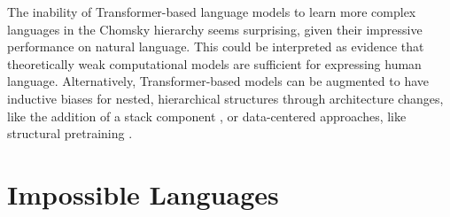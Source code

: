 \documentclass[11pt]{article}
\begin{document}
The inability of Transformer-based language models to learn more complex languages in the Chomsky hierarchy seems surprising, given their impressive performance on natural language. This could be interpreted as evidence that theoretically weak computational models are sufficient for expressing human language. Alternatively, Transformer-based models can be augmented to have inductive biases for nested, hierarchical structures through architecture changes, like the addition of a stack component  \cite{hao-etal-2018-context, murty2023pushdown}, or data-centered approaches, like structural pretraining \cite{papadimitriou2023injecting}.

\section{Impossible Languages} \label{sec:impossible-languages}
\end{document}
